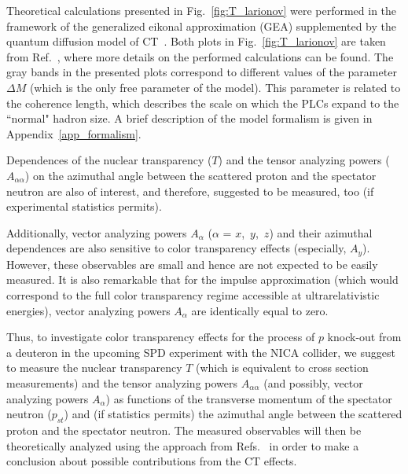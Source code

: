 Theoretical calculations presented in Fig.~\ref{fig:T_larionov} were performed in the framework of the generalized eikonal approximation (GEA) supplemented by the quantum diffusion model of CT~\cite{Frankfurt:1996uz,PhysRevC.107.014605,Larionov:2025equ,Farrar:1988me}. Both plots in Fig.~\ref{fig:T_larionov} are taken from Ref.~\cite{Larionov:2025equ}, where more details on the performed calculations can be found. The gray bands in the presented plots correspond to different values of the parameter $\Delta M$ (which is the only free parameter of the model). This parameter is related to the coherence length, which describes the scale on which the PLCs expand to the ``normal" hadron size. A brief description of the model formalism is given in Appendix~\ref{app_formalism}.

Dependences of the nuclear transparency ($T$) and the tensor analyzing powers ($A_{\alpha\alpha}$) on the azimuthal angle between the scattered proton and the spectator neutron are also of interest, and therefore, suggested to be measured, too (if experimental statistics permits).

Additionally, vector analyzing powers $A_{\alpha}$ ($\alpha$ = $x$,~$y$,~$z$) and their azimuthal dependences are also sensitive to color transparency effects (especially, $A_{y}$). However, these observables are small and hence are not expected to be easily measured. It is also remarkable that for the impulse approximation (which would correspond to the full color transparency regime accessible at ultrarelativistic energies), vector analyzing powers $A_{\alpha}$ are identically equal to zero.


Thus, to investigate color transparency effects for the process of $p$ knock-out from a deuteron in the upcoming SPD experiment with the NICA collider, we suggest to measure the nuclear transparency $T$ (which is equivalent to cross section measurements) and the tensor analyzing powers $A_{\alpha\alpha}$ (and possibly, vector analyzing powers $A_{\alpha}$) as functions of the transverse momentum of the spectator neutron ($p_{st}$) and (if statistics permits) the azimuthal angle between the scattered proton and the spectator neutron. The measured observables will then be theoretically analyzed using the approach from Refs.~\cite{Frankfurt:1996uz,PhysRevC.107.014605,Larionov:2025equ,Farrar:1988me} in order to make a conclusion about possible contributions from the CT effects.



